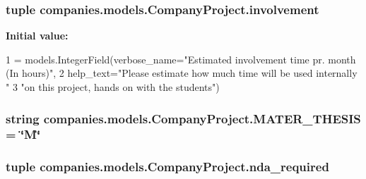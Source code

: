 \hypertarget{classcompanies_1_1models_1_1_company_project_a0f2cedd0374d9c24196c2f8e84b301ae}{
\subsubsection[{involvement}]{\setlength{\rightskip}{0pt plus 5cm}tuple companies.\-models.\-Company\-Project.\-involvement\hspace{0.3cm}{\ttfamily [static]}}}\label{classcompanies_1_1models_1_1_company_project_a0f2cedd0374d9c24196c2f8e84b301ae}
{\bfseries Initial value\-:}
\begin{DoxyCode}
1 = models.IntegerField(verbose\_name=\textcolor{stringliteral}{"Estimated involvement time pr. month (In hours)"},
2                                       help\_text=\textcolor{stringliteral}{"Please estimate how much time will be used internally "}
3                                                 \textcolor{stringliteral}{"on this project, hands on with the students"})
\end{DoxyCode}
\hypertarget{classcompanies_1_1models_1_1_company_project_a9bc478aef83dd23eaeb3a18b4f498b80}{
\subsubsection[{M\-A\-T\-E\-R\-\_\-\-T\-H\-E\-S\-I\-S}]{\setlength{\rightskip}{0pt plus 5cm}string companies.\-models.\-Company\-Project.\-M\-A\-T\-E\-R\-\_\-\-T\-H\-E\-S\-I\-S = \char`\"{}M\char`\"{}\hspace{0.3cm}{\ttfamily [static]}}}\label{classcompanies_1_1models_1_1_company_project_a9bc478aef83dd23eaeb3a18b4f498b80}
\hypertarget{classcompanies_1_1models_1_1_company_project_a07ee030ab328397c70017dd999d03fa6}{
\subsubsection[{nda\-\_\-required}]{\setlength{\rightskip}{0pt plus 5cm}tuple companies.\-models.\-Company\-Project.\-nda\-\_\-required\hspace{0.3cm}{\ttfamily [static]}}}\label{classcompanies_1_1models_1_1_company_project_a07ee030ab328397c70017dd999d03fa6}
